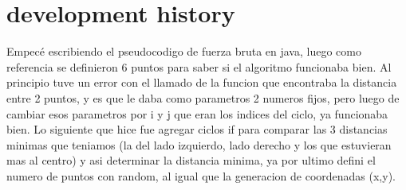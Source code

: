 \section{development history}
Empecé escribiendo el pseudocodigo de fuerza bruta en java, luego como referencia se definieron 6 puntos para saber si el algoritmo funcionaba bien. Al principio tuve un error con el llamado de la funcion que encontraba la distancia entre 2 puntos, y es que le daba como parametros 2 numeros fijos, pero luego de cambiar esos parametros por i y j que eran los indices del ciclo, ya funcionaba bien. Lo siguiente que hice fue agregar ciclos if para comparar las 3 distancias minimas que teniamos (la del lado izquierdo, lado derecho y los que estuvieran mas al centro) y asi determinar la distancia minima, ya por ultimo defini el numero de puntos con random, al igual que la generacion de coordenadas (x,y).
